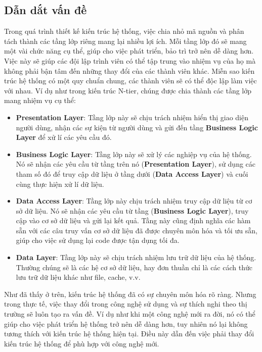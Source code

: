 \documentclass[../DoAn.tex]{subfiles}
\begin{document}
\subsection{Dẫn dắt vấn đề}
\label{subsection:clean_architecture-problem}
Trong quá trình thiết kế kiến trúc hệ thống, việc chia nhỏ mã nguồn và phân tách thành các tầng lớp riêng mang lại nhiều lợi ích. Mỗi tầng lớp đó sẽ mang một vài chức năng cụ thể, giúp cho việc phát triển, bảo trì trở nên dễ dàng hơn. Việc này sẽ giúp các đội lập trình viên có thể tập trung vào nhiệm vụ của họ mà không phải bận tâm đến những thay đổi của các thành viên khác. Miễn sao kiến trúc hệ thống có một quy chuẩn chung, các thành viên sẽ có thể độc lập làm việc với nhau. Ví dụ như trong kiến trúc N-tier, chúng được chia thành các tầng lớp mang nhiệm vụ cụ thể:
\begin{itemize}
    \item \textbf{Presentation Layer}: Tầng lớp này sẽ chịu trách nhiệm hiển thị giao diện người dùng, nhận các sự kiện từ người dùng và gửi đến tầng \textbf{Business Logic Layer} để xử lí các yêu cầu đó.
    \item \textbf{Business Logic Layer}: Tầng lớp này sẽ xử lý các nghiệp vụ của hệ thống. Nó sẽ nhận các yêu cầu từ tầng trên nó (\textbf{Presentation Layer}), sử dụng các tham số đó để truy cập dữ liệu ở tầng dưới (\textbf{Data Access Layer}) và cuối cùng thực hiện xử lí dữ liệu.
    \item \textbf{Data Access Layer}: Tầng lớp này chịu trách nhiệm truy cập dữ liệu từ cơ sở dữ liệu. Nó sẽ nhận các yêu cầu từ tầng (\textbf{Business Logic Layer}), truy cập vào cơ sở dữ liệu và gửi lại kết quả. Tầng này cũng định nghĩa các hàm sẵn với các câu truy vấn cơ sở dữ liệu đã được chuyên môn hóa và tối ưu sẵn, giúp cho việc sử dụng lại code được tận dụng tối đa.
    \item \textbf{Data Layer}: Tầng lớp này sẽ chịu trách nhiệm lưu trữ dữ liệu của hệ thống. Thường chúng sẽ là các hệ cơ sở dữ liệu, hay đơn thuần chỉ là các cách thức lưu trữ dữ liệu khác như file, cache, v.v.
\end{itemize}
Như đã thấy ở trên, kiến trúc hệ thống đã có sự chuyên môn hóa rõ ràng. Nhưng trong thực tế, việc thay đổi trong công nghệ sử dụng và sự thích nghi theo thị trường sẽ luôn tạo ra vấn đề. Ví dụ như khi một công nghệ mới ra đời, nó có thể giúp cho việc phát triển hệ thống trở nên dễ dàng hơn, tuy nhiên nó lại không tương thích với kiến trúc hệ thống hiện tại. Điều này dẫn đến việc phải thay đổi kiến trúc hệ thống để phù hợp với công nghệ mới.
\vfill
\break
\end{document}
